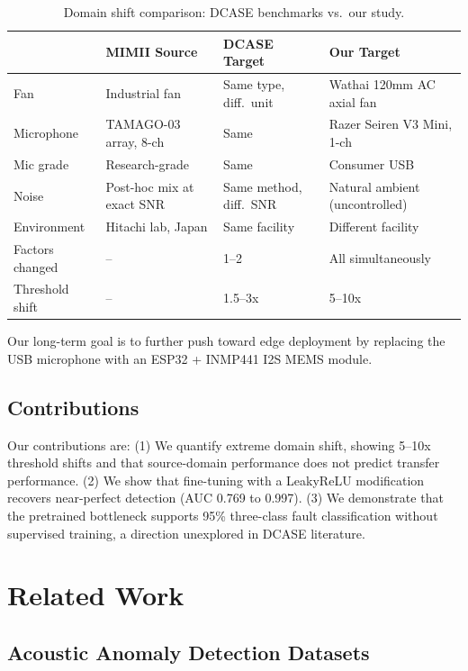 \documentclass[sigconf]{acmart}
\begin{document}
\begin{table}[t]
\centering
\caption{Domain shift comparison: DCASE benchmarks vs.\ our study.}
\label{tab:domainshift}
\begin{tabular}{l l l l}
\toprule
& MIMII Source & DCASE Target & Our Target \\
\midrule
Fan & Industrial fan & Same type, diff.\ unit & Wathai 120mm AC axial fan \\
Microphone & TAMAGO-03 array, 8-ch & Same & Razer Seiren V3 Mini, 1-ch \\
Mic grade & Research-grade & Same & Consumer USB \\
Noise & Post-hoc mix at exact SNR & Same method, diff.\ SNR & Natural ambient (uncontrolled) \\
Environment & Hitachi lab, Japan & Same facility & Different facility \\
\midrule
Factors changed & -- & 1--2 & All simultaneously \\
Threshold shift & -- & 1.5--3x & 5--10x \\
\bottomrule
\end{tabular}
\end{table}

Our long-term goal is to further push toward edge deployment by replacing the USB microphone with an ESP32 + INMP441 I2S MEMS module.

\subsection{Contributions}

Our contributions are: (1) We quantify extreme domain shift, showing 5--10x threshold shifts and that source-domain performance does not predict transfer performance. (2) We show that fine-tuning with a LeakyReLU modification recovers near-perfect detection (AUC 0.769 to 0.997). (3) We demonstrate that the pretrained bottleneck supports 95\% three-class fault classification without supervised training, a direction unexplored in DCASE literature.

\section{Related Work}

\subsection{Acoustic Anomaly Detection Datasets}
\end{document}

